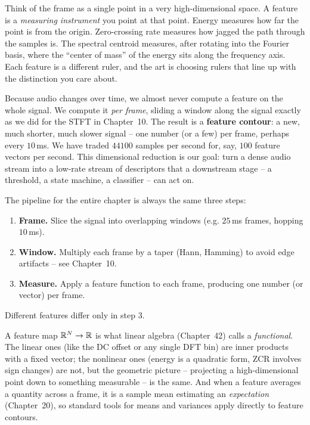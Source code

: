 \begin{intuitionbox}
Think of the frame as a single point in a very high-dimensional space. A feature
is a \emph{measuring instrument} you point at that point. Energy measures how far
the point is from the origin. Zero-crossing rate measures how jagged the path
through the samples is. The spectral centroid measures, after rotating into the
Fourier basis, where the ``center of mass'' of the energy sits along the frequency
axis. Each feature is a different ruler, and the art is choosing rulers that line
up with the distinction you care about.
\end{intuitionbox}

Because audio changes over time, we almost never compute a feature on the whole
signal. We compute it \emph{per frame}, sliding a window along the signal exactly
as we did for the STFT in Chapter~10. The result is a \textbf{feature contour}: a
new, much shorter, much slower signal -- one number (or a few) per frame, perhaps
every $10$\,ms. We have traded $44100$ samples per second for, say, $100$ feature
vectors per second. This dimensional reduction is our goal: turn a dense audio stream into a
low-rate stream of descriptors that a downstream stage -- a threshold, a state
machine, a classifier -- can act on.

\begin{focusbox}
The pipeline for the entire chapter is always the same three steps:
\begin{enumerate}
  \item \textbf{Frame.} Slice the signal into overlapping windows (e.g. $25$\,ms
        frames, hopping $10$\,ms).
  \item \textbf{Window.} Multiply each frame by a taper (Hann, Hamming) to avoid
        edge artifacts -- see Chapter~10.
  \item \textbf{Measure.} Apply a feature function to each frame, producing one
        number (or vector) per frame.
\end{enumerate}
Different features differ only in step 3.
\end{focusbox}

\begin{connectionbox}
A feature map $\mathbb{R}^N \to \mathbb{R}$ is what linear algebra (Chapter~42)
calls a \emph{functional}. The linear ones (like the DC offset or any single
DFT bin) are inner products with a fixed vector; the nonlinear ones (energy is a
quadratic form, ZCR involves sign changes) are not, but the geometric picture --
projecting a high-dimensional point down to something measurable -- is the same.
And when a feature averages a quantity across a frame, it is a sample mean estimating an
\emph{expectation} (Chapter~20), so standard tools for means and variances apply
directly to feature contours.
\end{connectionbox}

